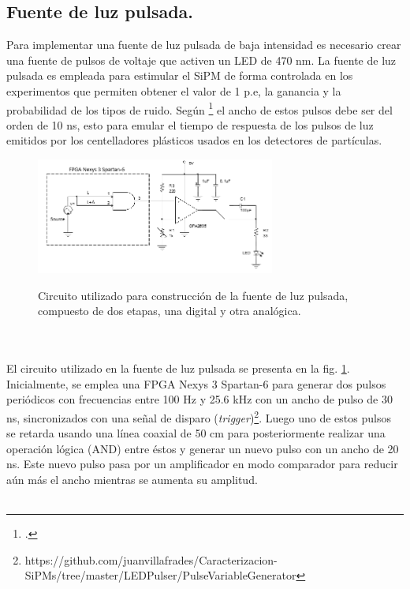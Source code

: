 \subsection{Fuente de luz pulsada.}
Para implementar una fuente de luz pulsada de baja intensidad es necesario crear una fuente de pulsos de voltaje que activen un LED de 470 nm. La fuente de luz pulsada es  empleada para estimular el SiPM de forma controlada en los experimentos que permiten obtener el valor de 1 p.e, la ganancia y la probabilidad de los tipos de ruido. Según \footcite{Deisgn_LED_driver} el ancho de estos pulsos debe ser del orden de 10 ns, esto para emular el tiempo de respuesta de los pulsos de luz emitidos por los centelladores plásticos usados en los detectores de partículas.  
\begin{figure}[h!]
\begin{centering}
    \caption{Circuito utilizado para construcción de la fuente de luz pulsada, compuesto de dos etapas, una digital y otra analógica.}
    \includegraphics[width=0.7\textwidth]{Images/LED_circuit.PNG}
    \label{fig:LED_circuit}
  \par\end{centering}
\end{figure}
\\ \\
El circuito utilizado en la fuente de luz pulsada se presenta en la fig. \ref{fig:LED_circuit}. Inicialmente, se emplea una FPGA Nexys 3 Spartan-6 para generar dos pulsos periódicos con frecuencias entre 100 Hz y 25.6 kHz con un ancho de pulso de 30 ns, sincronizados con una señal de disparo (\textit{trigger})\footnote{https://github.com/juanvillafrades/Caracterizacion-SiPMs/tree/master/LEDPulser/PulseVariableGenerator}. Luego uno de estos pulsos se retarda usando una línea coaxial de 50 cm para posteriormente realizar una operación lógica (AND) entre éstos y generar un nuevo pulso con un ancho de 20 ns. Este nuevo pulso pasa por un amplificador en  modo comparador para reducir aún más el ancho mientras se aumenta su amplitud. \\ \\
